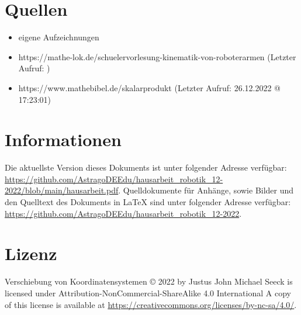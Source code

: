 \documentclass{article}
\begin{document}

    \newpage

    \section{Quellen}

    \begin{itemize}
        \item eigene Aufzeichnungen
        \item https://mathe-lok.de/schuelervorlesung-kinematik-von-roboterarmen (Letzter Aufruf: )
        \item https://www.mathebibel.de/skalarprodukt (Letzter Aufruf: 26.12.2022 @ 17:23:01)
    \end{itemize}

    \section{Informationen}

    Die aktuellste Version dieses Dokuments ist unter folgender Adresse verfügbar:
    \url{https://github.com/AstragoDEEdu/hausarbeit_robotik_12-2022/blob/main/hausarbeit.pdf}.
    Quelldokumente für Anhänge, sowie Bilder und den Quelltext des Dokuments in \LaTeX{} sind unter folgender Adresse verfügbar:
    \url{https://github.com/AstragoDEEdu/hausarbeit_robotik_12-2022}.

    \section{Lizenz}

    Verschiebung von Koordinatensystemen © 2022 by Justus John Michael Seeck is licensed under Attribution-NonCommercial-ShareAlike 4.0 International
    A copy of this license is available at \url{https://creativecommons.org/licenses/by-nc-sa/4.0/}.
\end{document}

